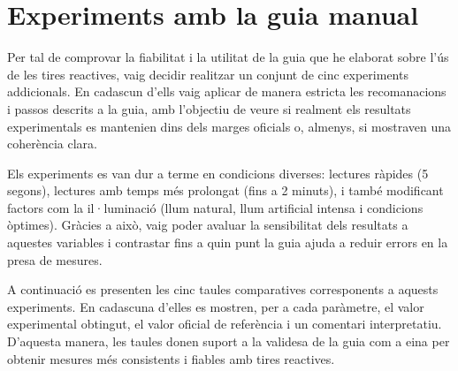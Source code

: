 \chapter{Experiments amb la guia manual} \label{a:guia}

Per tal de comprovar la fiabilitat i la utilitat de la guia que he elaborat sobre l’ús de les tires reactives, vaig decidir realitzar un conjunt de cinc experiments addicionals. En cadascun d’ells vaig aplicar de manera estricta les recomanacions i passos descrits a la guia, amb l’objectiu de veure si realment els resultats experimentals es mantenien dins dels marges oficials o, almenys, si mostraven una coherència clara.

Els experiments es van dur a terme en condicions diverses: lectures ràpides (5 segons), lectures amb temps més prolongat (fins a 2 minuts), i també modificant factors com la il·luminació (llum natural, llum artificial intensa i condicions òptimes). Gràcies a això, vaig poder avaluar la sensibilitat dels resultats a aquestes variables i contrastar fins a quin punt la guia ajuda a reduir errors en la presa de mesures.

A continuació es presenten les cinc taules comparatives corresponents a aquests experiments. En cadascuna d’elles es mostren, per a cada paràmetre, el valor experimental obtingut, el valor oficial de referència i un comentari interpretatiu. D’aquesta manera, les taules donen suport a la validesa de la guia com a eina per obtenir mesures més consistents i fiables amb tires reactives.


